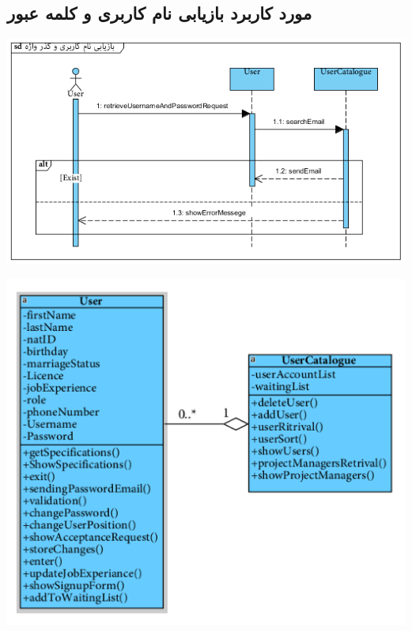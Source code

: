 \subsection*{مورد کاربرد بازیابی نام کاربری و کلمه عبور}
\vspace{2cm}
\begin{center}
\includegraphics[width=\textwidth]{SequenceDiagrams/13.png}
\end{center}

\newpage
\vspace{2cm}
\begin{center}
\includegraphics[width=\textwidth]{SequenceClasses/13.png}
\end{center}

\newpage
\vspace{2cm}
